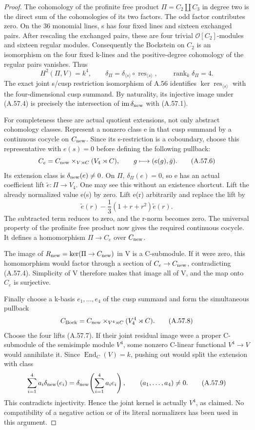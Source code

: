 \begin{proof}
The cohomology of the profinite free product \(\Pi=C_2\amalg C_3\)
in degree two is the direct sum of the cohomologies of its two
factors. The odd factor contributes zero. On the 36 monomial
lines, s has four fixed lines and sixteen exchanged pairs.
After rescaling the exchanged pairs, these are four trivial
\(\mathcal O[C_2]\)-modules and sixteen regular modules.
Consequently the Bockstein on \(C_2\) is an isomorphism on the
four fixed k-lines and the positive-degree cohomology of the
regular pairs vanishes. Thus
\[
 H^2(\Pi,V)=k^4,\qquad
 \delta_{\Pi}=\delta_{\langle s\rangle}\circ
     \operatorname{res}_{\langle s\rangle},\qquad
 \operatorname{rank}_k\delta_{\Pi}=4.
 \tag{A.57.5}
\]
The exact joint s/cusp restriction isomorphism of A.56 identifies
\(\ker\operatorname{res}_{\langle s\rangle}\) with the
four-dimensional cusp summand. By naturality, its injective image
under (A.57.4) is precisely the intersection of
\(\operatorname{im}\delta_{\rm new}\) with (A.57.1).

For completeness these are actual quotient extensions, not only
abstract cohomology classes. Represent a nonzero class e in that
cusp summand by a continuous cocycle on \(C_{\rm new}\).
Since its s-restriction is a coboundary, choose this representative
with \(e(s)=0\) before defining the following pullback:
\[
 C_e=C_{\rm new}\mathbin{\times}_{V\rtimes C}(V_4\rtimes C),
 \qquad g\longmapsto(e(g),\bar g).
 \tag{A.57.6}
\]
Its extension class is \(\delta_{\rm new}(e)\ne0\). On \(\Pi\),
\(\delta_{\Pi}(e)=0\), so e has an actual coefficient lift
\(\widetilde e:\Pi\to V_4\). One may see this without an
existence shortcut. Lift the already normalized value e(s) by zero.
Lift e(r) arbitrarily and replace the lift by
\[
 \widetilde e(r)-\frac13(1+r+r^2)\widetilde e(r).
 \tag{A.57.7}
\]
The subtracted term reduces to zero, and the r-norm becomes zero.
The universal property of the profinite free product now gives
the required continuous cocycle. It defines a homomorphism
\(\Pi\to C_e\) over \(C_{\rm new}\).

The image of \(R_{\rm new}=\ker(\Pi\to C_{\rm new})\) in V is a
C-submodule. If it were zero, this homomorphism would factor
through a section of \(C_e\to C_{\rm new}\), contradicting
(A.57.4). Simplicity of V therefore makes that image all of V,
and the map onto \(C_e\) is surjective.

Finally choose a k-basis \(e_1,\ldots,e_4\) of the cusp summand
and form the simultaneous pullback
\[
 C_{\rm Bock}
   =C_{\rm new}\mathbin{\times}_{V^4\rtimes C}(V_4^4\rtimes C).
 \tag{A.57.8}
\]
Choose the four lifts (A.57.7). If their joint residual image
were a proper C-submodule of the semisimple module \(V^4\), some
nonzero C-linear functional \(V^4\to V\) would annihilate it.
Since \(\operatorname{End}_C(V)=k\), pushing out would split the
extension with class
\[
 \sum_{i=1}^4 a_i\delta_{\rm new}(e_i)
 =\delta_{\rm new}\!\left(\sum_{i=1}^4a_i e_i\right),
 \qquad (a_1,\ldots,a_4)\ne0.
 \tag{A.57.9}
\]
This contradicts injectivity. Hence the joint kernel is actually
\(V^4\), as claimed. No compatibility of a negative action or of
its literal normalizers has been used in this argument.
\end{proof}


